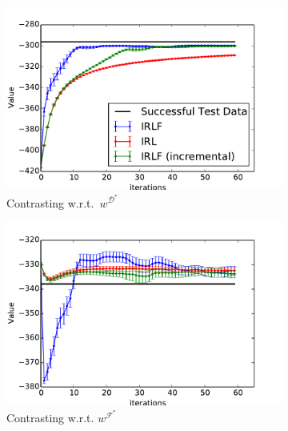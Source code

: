 \documentclass[a4paper,11pt]{report}
\begin{document}
\begin{figure}[h!]
  \centering
  \begin{subfigure}[t]{0.49\columnwidth}
    \includegraphics[clip=true,width=1.0\textwidth]{figures/expert_apprentice_contrastive.pdf}
    \caption{Contrasting w.r.t.\ $w^{\mathcal{D}^*}$}
    \label{fig:toy_expert_apprentice_contrastive}
   \end{subfigure}
     \begin{subfigure}[t]{0.49\columnwidth}
    \includegraphics[clip=true,width=1.0\textwidth]{figures/taboo_apprentice_contrastive.pdf}
    \caption{Contrasting w.r.t. $w^{\mathcal{F}^*}$}
    \label{fig:toy_taboo_apprentice_contrastive}
   \end{subfigure}
   \\
   \begin{subfigure}[t]{0.49\columnwidth}
   \hspace{2mm}

\end{subfigure}
\end{figure}
\end{document}
